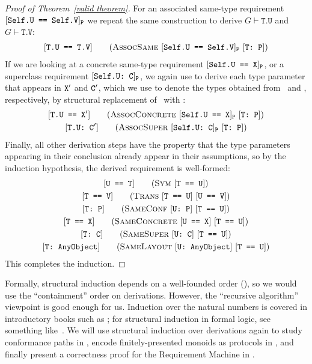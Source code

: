\documentclass[../generics]{subfiles}
\begin{document}
\begin{proof}[Proof of Theorem~\ref*{valid theorem}]
For an associated same-type requirement $[\texttt{Self.U == Self.V}]_{\texttt{P}}$ we repeat the same construction to derive $G\vdash\texttt{T.U}$ and $G\vdash\texttt{T.V}$:
\begin{gather*}
\AssocSameStepDef
\end{gather*}
If we are looking at a concrete same-type requirement $[\texttt{Self.U == X}]_{\texttt{P}}$, or a superclass requirement $[\texttt{Self.U:~C}]_{\texttt{P}}$, we again use  to derive each type parameter that appears in $\texttt{X}^\prime$ and $\texttt{C}^\prime$, which we use to denote the types obtained from \tX\ and \tC, respectively, by structural replacement of \tSelf\ with \tT:
\begin{gather*}
\AssocConcreteStepDef\\
\AssocSuperStepDef
\end{gather*}
Finally, all other derivation steps have the property that the type parameters appearing in their conclusion already appear in their assumptions, so by the induction hypothesis, the derived requirement is well-formed:
\begin{gather*}
\SymStepDef\\
\TransStepDef\\
\SameConfStepDef\\
\SameConcreteStepDef\\
\SameSuperStepDef\\
\SameLayoutStepDef
\end{gather*}
This completes the induction.
\end{proof}
Formally, structural induction depends on a well-founded order (), so we would use the ``containment'' order on derivations. However, the ``recursive algorithm'' viewpoint is good enough for us. Induction over the natural numbers is covered in introductory books such as \cite{grimaldi}; for structural induction in formal logic, see something like~\cite{bradley2007calculus}. We will use structural induction over derivations again to study conformance paths in , encode finitely-presented monoids as protocols in , and finally present a correctness proof for the Requirement Machine in .

\medskip
\end{document}

